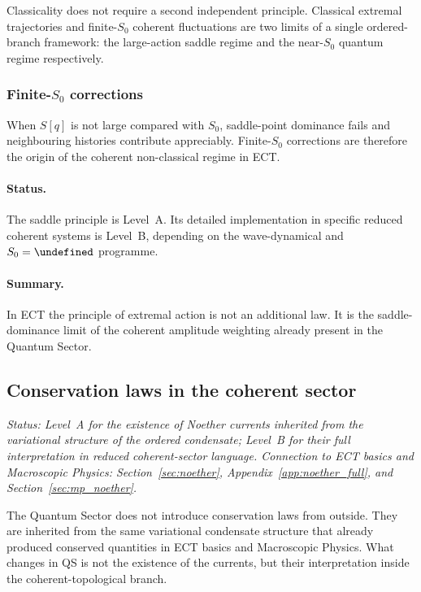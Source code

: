 \documentclass[11pt,a4paper]{article}
\let\hbar\undefined
\numberwithin{equation}{section}
\begin{document}
Classicality does not require a second independent principle.
Classical extremal trajectories and finite-$S_0$ coherent fluctuations
are two limits of a single ordered-branch framework: the large-action
saddle regime and the near-$S_0$ quantum regime respectively.

\subsubsection*{Finite-$S_0$ corrections}

When $S[q]$ is not large compared with $S_0$, saddle-point dominance
fails and neighbouring histories contribute appreciably.
Finite-$S_0$ corrections are therefore the origin of the coherent
non-classical regime in ECT.

\paragraph{Status.}
The saddle principle is Level~A.
Its detailed implementation in specific reduced coherent systems is
Level~B, depending on the wave-dynamical and $S_0=\hbar$ programme.

\paragraph{Summary.}
In ECT the principle of extremal action is not an additional law.
It is the saddle-dominance limit of the coherent amplitude weighting
already present in the Quantum Sector.

\subsection{Conservation laws in the coherent sector}
\label{sec:qs_conservation}

\textit{Status: Level~A for the existence of Noether currents inherited
from the variational structure of the ordered condensate; Level~B for
their full interpretation in reduced coherent-sector language.
Connection to ECT basics and Macroscopic Physics:
Section~\ref{sec:noether}, Appendix~\ref{app:noether_full}, and
Section~\ref{sec:mp_noether}.}

\medskip
The Quantum Sector does not introduce conservation laws from outside.
They are inherited from the same variational condensate structure that
already produced conserved quantities in ECT basics and Macroscopic
Physics.
What changes in QS is not the existence of the currents, but their
interpretation inside the coherent-topological branch.
\end{document}
